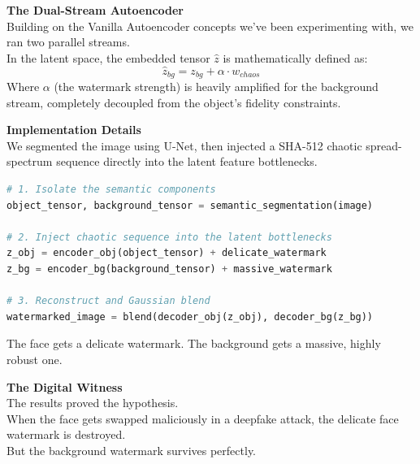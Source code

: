 \documentclass{article}
\begin{document}
\thispagestyle{empty}
\vspace*{1in}
{\Huge \textbf{The Dual-Stream Autoencoder}}\\[0.5in]
{\Large Building on the Vanilla Autoencoder concepts we've been experimenting with, we ran two parallel streams.}\\[0.3in]
{\Large In the latent space, the embedded tensor \(\widehat{z}\) is mathematically defined as:}
\[
\widehat{z}_{bg} = z_{bg} + \alpha \cdot w_{chaos}
\]
\vspace*{0.2in}
{\Large Where \(\alpha\) (the watermark strength) is heavily amplified for the background stream, completely decoupled from the object's fidelity constraints.}
\newpage

\thispagestyle{empty}
\vspace*{1in}
{\Huge \textbf{Implementation Details}}\\[0.5in]
{\Large We segmented the image using U-Net, then injected a SHA-512 chaotic spread-spectrum sequence directly into the latent feature bottlenecks.}\\[0.3in]

\begin{lstlisting}[language=Python, title=Semantic Partitioning]
# 1. Isolate the semantic components
object_tensor, background_tensor = semantic_segmentation(image)

# 2. Inject chaotic sequence into the latent bottlenecks
z_obj = encoder_obj(object_tensor) + delicate_watermark
z_bg = encoder_bg(background_tensor) + massive_watermark

# 3. Reconstruct and Gaussian blend
watermarked_image = blend(decoder_obj(z_obj), decoder_bg(z_bg))
\end{lstlisting}
\vspace*{0.3in}
{\Large The face gets a delicate watermark. The background gets a massive, highly robust one.}
\newpage

\thispagestyle{empty}
\vspace*{1in}
{\Huge \textbf{The Digital Witness}}\\[0.5in]
{\Large The results proved the hypothesis.}\\[0.3in]
{\Large When the face gets swapped maliciously in a deepfake attack, the delicate face watermark is destroyed.}\\[0.3in]
{\Large But the background watermark survives perfectly.}\\[0.5in]
\end{document}
